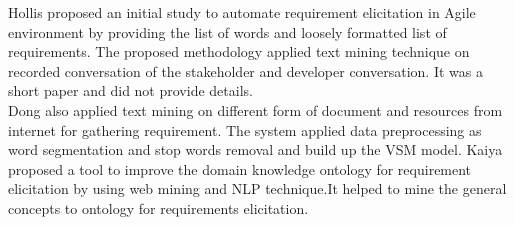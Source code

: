 Hollis \etal \cite{Hollis2017} proposed an initial study to automate requirement
elicitation in Agile environment by providing the list of words and loosely
formatted list of requirements. The proposed methodology applied text mining
technique on recorded conversation of the stakeholder and developer
conversation. It was a short paper and did not provide details.\\

Dong \etal \cite{dong2010} also applied text mining on different form of
document and resources from internet for gathering requirement. The system
applied data preprocessing as word segmentation and stop words removal and build
up the VSM model. Kaiya \etal \cite{Kaiya:2010} proposed a tool to improve the
domain knowledge ontology for requirement elicitation by using web mining and
NLP technique.It helped to mine the general concepts to ontology for
requirements elicitation.\\


